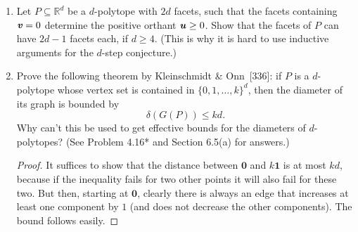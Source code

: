 \documentclass{article}
\begin{document}
\begin{enumerate}
\begin{solution}
Recall that a \textit{pointed} polyhedra $P$ is such that $\lineal(P) = \{\textbf{0}\}$, or equivalently that it does not contain a 'line'. If the graph of bounded edges $G(P)$ is disconnected, $P$ must contain a line of separation, which then means $\lineal(P) \neq \{\textbf{0}\}$, a contradiction. Write $P = \conv(V) + \cone(Y)$. If $\dim(\conv(V)) = 1$ we clearly don't have 2-connectedness. If $\dim(\conv(V)) = 2$ and $\dim(\cone(Y)) \leq 1$, and furthermore that the vector $Y$ is orthogonal to the affine plane of the polytope $\conv(V)$, $G(P)$ is 2-connected. Of course if $\dim(\conv(V)) = 3$ and $\dim(\cone(Y)) \leq 1$, $G(P)$ is 2-connected as well. Otherwise $G(P)$ is only connected.

In general the number of (orthogonal) directions for which $\conv(V)$ is orthogonal to the cone $\cone(Y)$ determines the 'dimension' of $G(P)$, which by Balinski's theorem gives $d$-connectedness.

\begin{remark}
    I wonder if a $d$-connected graph can always be realized as a $d$-polytope...
\end{remark}
\end{solution}

\item Let $P \subseteq \mathbb{R}^d$ be a $d$-polytope with $2d$ facets, such that the facets containing $\textbf{\textit{v}} = 0$ determine the positive orthant $\textbf{\textit{u}} \ge 0$. Show that the facets of $P$ can have $2d-1$ facets each, if $d \ge 4$. (This is why it is hard to use inductive arguments for the $d$-step conjecture.)

\begin{solution}
\end{solution}

\item Prove the following theorem by Kleinschmidt \& Onn~[336]: if $P$ is a $d$-polytope whose vertex set is contained in $\{0,1,\ldots,k\}^d$, then the diameter of its graph is bounded by
\[\delta(G(P)) \le kd.\]
Why can't this be used to get effective bounds for the diameters of $d$-polytopes? (See Problem 4.16* and Section 6.5(a) for answers.)

\begin{proof}
    It suffices to show that the distance between $\textbf{0}$ and $k\textbf{1}$ is at most $kd$, because if the inequality fails for two other points it will also fail for these two. But then, starting at $\textbf{0}$, clearly there is always an edge that increases at least one component by $1$ (and does not decrease the other components). The bound follows easily.


\end{proof}
\end{enumerate}
\end{document}
